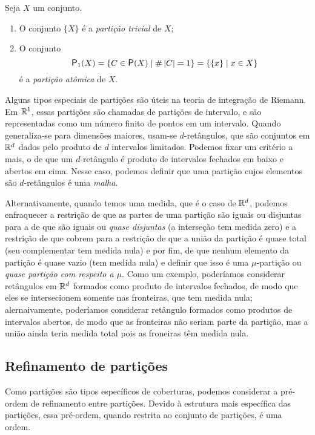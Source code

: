 \begin{example}
Seja $X$ um conjunto.
	\begin{enumerate}
	\item O conjunto $\{X\}$ é a \emph{partição trivial} de $X$;
	\item O conjunto
		\begin{equation*}
		\p_1(X) = \set{C \in \p(X)}{\card{C}=1} = \set{\{x\}}{x \in X}
		\end{equation*}
	é a \emph{partição atômica} de $X$.
	\end{enumerate}
\end{example}

Alguns tipos especiais de partições são úteis na teoria de integração de Riemann. Em $\mathbb{R}^1$, essas partições são chamadas de partições de intervalo, e são representadas como um número finito de pontos em um intervalo. Quando generaliza-se para dimensões maiores, usam-se $d$-retângulos, que são conjuntos em $\mathbb{R}^d$ dados pelo produto de $d$ intervalos limitados. Podemos fixar um critério a mais, o de que um $d$-retângulo é produto de intervalos fechados em baixo e abertos em cima. Nesse caso, podemos definir que uma partição cujos elementos são $d$-retângulos é uma \emph{malha}.

Alternativamente, quando temos uma medida, que é o caso de $\mathbb{R}^d$, podemos enfraquecer a restrição de que as partes de uma partição são iguais ou disjuntas para a de que são iguais ou \emph{quase disjuntas} (a interseção tem medida zero) e a restrição de que cobrem para a restrição de que a união da partição é quase total (seu complementar tem medida nula) e por fim, de que nenhum elemento da partição é quase vazio (tem medida nula) e definir que isso é uma $\mu$-partição ou \emph{quase partição com respeito a $\mu$}. Como um exemplo, poderíamos considerar retângulos em $\mathbb{R}^d$ formados como produto de intervalos fechados, de modo que eles se intersecionem somente nas fronteiras, que tem medida nula; alernaivamente, poderíamos considerar retângulo formados como produtos de intervalos abertos, de modo que as fronteiras não seriam parte da partição, mas a união ainda teria medida total pois as froneiras têm medida nula.

\subsection{Refinamento de partições}

Como partições são tipos específicos de coberturas, podemos considerar a pré-ordem de refinamento entre partições. Devido à estrutura mais específica das partições, essa pré-ordem, quando restrita ao conjunto de partições, é uma ordem.


